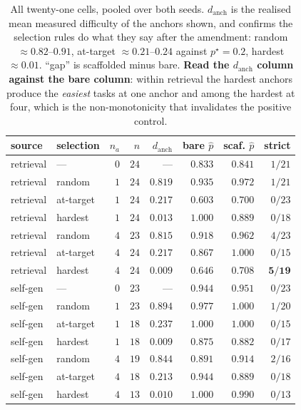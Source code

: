 \begin{table}[t]
\centering\small
\caption{All twenty-one cells, pooled over both seeds. $d_{\text{anch}}$ is the realised mean
measured difficulty of the anchors shown, and confirms the selection rules do what they say
after the amendment: random $\approx 0.82$--$0.91$, at-target $\approx 0.21$--$0.24$ against
$p^\star = 0.2$, hardest $\approx 0.01$. ``gap'' is scaffolded minus bare. \textbf{Read the
$d_{\text{anch}}$ column against the bare column}: within retrieval the hardest anchors produce
the \emph{easiest} tasks at one anchor and among the hardest at four, which is the
non-monotonicity that invalidates the positive control.}
\label{tab:anchorgrid}
\begin{tabular}{llrrrrrr}
\toprule
source & selection & $n_a$ & $n$ & $d_{\text{anch}}$ & bare $\hat p$ & scaf. $\hat p$ & strict \\
\midrule
retrieval & ---        & $0$ & $24$ & ---     & $0.833$ & $0.841$ & $1/21$ \\
retrieval & random     & $1$ & $24$ & $0.819$ & $0.935$ & $0.972$ & $1/21$ \\
retrieval & at-target  & $1$ & $24$ & $0.217$ & $0.603$ & $0.700$ & $0/23$ \\
retrieval & hardest    & $1$ & $24$ & $0.013$ & $1.000$ & $0.889$ & $0/18$ \\
retrieval & random     & $4$ & $23$ & $0.815$ & $0.918$ & $0.962$ & $4/23$ \\
retrieval & at-target  & $4$ & $24$ & $0.217$ & $0.867$ & $1.000$ & $0/15$ \\
retrieval & hardest    & $4$ & $24$ & $0.009$ & $0.646$ & $0.708$ & $\mathbf{5/19}$ \\
\midrule
self-gen  & ---        & $0$ & $23$ & ---     & $0.944$ & $0.951$ & $0/23$ \\
self-gen  & random     & $1$ & $23$ & $0.894$ & $0.977$ & $1.000$ & $1/20$ \\
self-gen  & at-target  & $1$ & $18$ & $0.237$ & $1.000$ & $1.000$ & $0/15$ \\
self-gen  & hardest    & $1$ & $18$ & $0.009$ & $0.875$ & $0.882$ & $0/17$ \\
self-gen  & random     & $4$ & $19$ & $0.844$ & $0.891$ & $0.914$ & $2/16$ \\
self-gen  & at-target  & $4$ & $18$ & $0.213$ & $0.944$ & $0.889$ & $0/18$ \\
self-gen  & hardest    & $4$ & $13$ & $0.010$ & $1.000$ & $0.990$ & $0/13$ \\
\midrule

\end{tabular}
\end{table}
